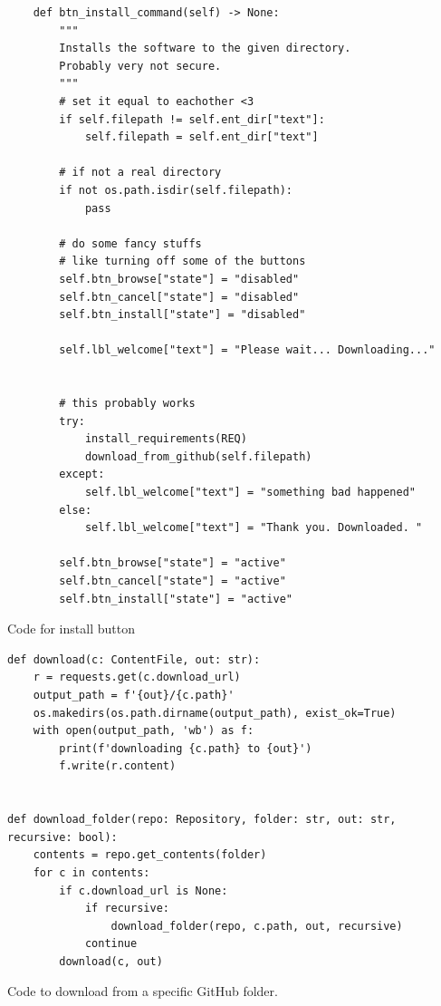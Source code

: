 \documentclass[11pt]{article}
\begin{document}
        \newpage
        \begin{listing}[!ht]
            \begin{verbatim}
    def btn_install_command(self) -> None:
        """ 
        Installs the software to the given directory. 
        Probably very not secure. 
        """
        # set it equal to eachother <3
        if self.filepath != self.ent_dir["text"]:
            self.filepath = self.ent_dir["text"]
            
        # if not a real directory
        if not os.path.isdir(self.filepath):
            pass
        
        # do some fancy stuffs
        # like turning off some of the buttons
        self.btn_browse["state"] = "disabled"
        self.btn_cancel["state"] = "disabled"
        self.btn_install["state"] = "disabled"
        
        self.lbl_welcome["text"] = "Please wait... Downloading..."
        
        
        # this probably works
        try:
            install_requirements(REQ)
            download_from_github(self.filepath)
        except:
            self.lbl_welcome["text"] = "something bad happened"
        else:
            self.lbl_welcome["text"] = "Thank you. Downloaded. "
        
        self.btn_browse["state"] = "active"
        self.btn_cancel["state"] = "active"
        self.btn_install["state"] = "active"
            \end{verbatim}
            \caption{Code for install button}
            \label{sc:install_btn_sc_c1}
        \end{listing}


        \newpage
        \begin{listing}[!ht]
            \begin{verbatim}
def download(c: ContentFile, out: str):
    r = requests.get(c.download_url)
    output_path = f'{out}/{c.path}'
    os.makedirs(os.path.dirname(output_path), exist_ok=True)
    with open(output_path, 'wb') as f:
        print(f'downloading {c.path} to {out}')
        f.write(r.content)


def download_folder(repo: Repository, folder: str, out: str, recursive: bool):
    contents = repo.get_contents(folder)
    for c in contents:
        if c.download_url is None:
            if recursive:
                download_folder(repo, c.path, out, recursive)
            continue
        download(c, out)
            \end{verbatim}
            \caption{Code to download from a specific GitHub folder.}
            \label{sc:dl_from_github_stolen_c1}
        \end{listing}
\end{document}
